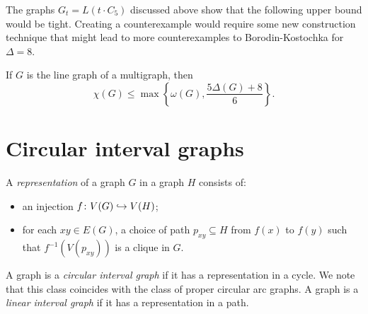 The graphs $G_t = L(t \cdot C_5)$ discussed above show that the following upper bound would be tight.  Creating a counterexample would require some new construction technique that might lead to more counterexamples to Borodin-Kostochka for $\Delta=8$.

\begin{conjecture}\label{BestPossibleWithJustDelta}
If $G$ is the line graph of a multigraph, then
\[\chi(G) \leq \max\left\{\omega(G),\frac{5\Delta(G) + 8}{6}\right\}.\]
\end{conjecture}

\section{Circular interval graphs}
A \emph{representation} of a graph $G$ in a graph $H$ consists of: 

\begin{itemize}
  \item an injection $f\colon V(G) \hookrightarrow V(H)$;
  \item for each $xy \in E(G)$, a choice of path $p_{xy} \subseteq H$ from
  $f(x)$ to $f(y)$ such that $f^{-1}(V(p_{xy}))$ is a clique in $G$.
\end{itemize}

A graph is a \emph{circular interval graph} if it has a representation in a
cycle. We note that this class coincides with the class of proper circular arc
graphs.  A graph is a \emph{linear interval graph} if it has a representation in
a path.


